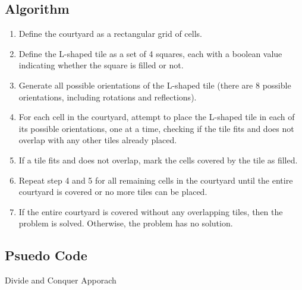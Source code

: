\documentclass{article}
\begin{document}
     \subsection{Algorithm}
     \begin{enumerate}
     \item Define the courtyard as a rectangular grid of cells.
     \item Define the L-shaped tile as a set of 4 squares, each with a boolean value indicating whether the square is filled or not.
     \item Generate all possible orientations of the L-shaped tile (there are 8 possible orientations, including rotations and reflections).
     \item For each cell in the courtyard, attempt to place the L-shaped tile in each of its possible orientations, one at a time, checking if the tile fits and does not overlap with any other tiles already placed.
     \item If a tile fits and does not overlap, mark the cells covered by the tile as filled.
     \item Repeat step 4 and 5 for all remaining cells in the courtyard until the entire courtyard is covered or no more tiles can be placed.
     \item If the entire courtyard is covered without any overlapping tiles, then the problem is solved. Otherwise, the problem has no solution.
     \end{enumerate}
     
     \newpage
     \subsection{Psuedo Code}{Divide and Conquer Apporach}
\end{document}
